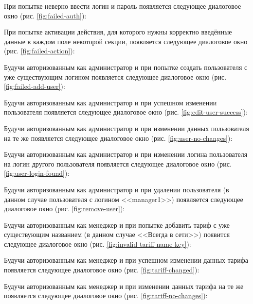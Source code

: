 При попытке неверно ввести логин и пароль появляется следующее диалоговое окно (рис. \ref{fig:failed-auth}):

При попытке активации действия, для которого нужны корректно введённые данные в каждом поле некоторой секции, появляется следующее диалоговое окно (рис. \ref{fig:failed-action}):

Будучи авторизованным как администратор и при попытке создать пользователя с уже существующим логином появляется следующее диалоговое окно (рис. \ref{fig:failed-add-user}):

Будучи авторизованным как администратор и при успешном изменении пользователя появляется следующее диалоговое окно (рис. \ref{fig:edit-user-success}):

Будучи авторизованным как администратор и при изменении данных пользователя на те же появляется следующее диалоговое окно (рис. \ref{fig:user-no-changes}):

Будучи авторизованным как администратор и при изменении логина пользователя на логин другого пользователя появляется следующее диалоговое окно (рис. \ref{fig:user-login-found}):

Будучи авторизованным как администратор и при удалении пользователя (в данном случае пользователя с логином <<manager1>>) появляется следующее диалоговое окно (рис. \ref{fig:remove-user}):

Будучи авторизованным как менеджер и при попытке добавить тариф с уже существующим названием (в данном случае <<Всегда в сети>>) появится следующее диалоговое окно (рис. \ref{fig:invalid-tariff-name-key}):

Будучи авторизованным как менеджер и при успешном изменении данных тарифа появляется следующее диалоговое окно (рис. \ref{fig:tariff-changed}):

Будучи авторизованным как менеджер и при изменении данных тарифа на те же появляется следующее диалоговое окно (рис. \ref{fig:tariff-no-changes}):

